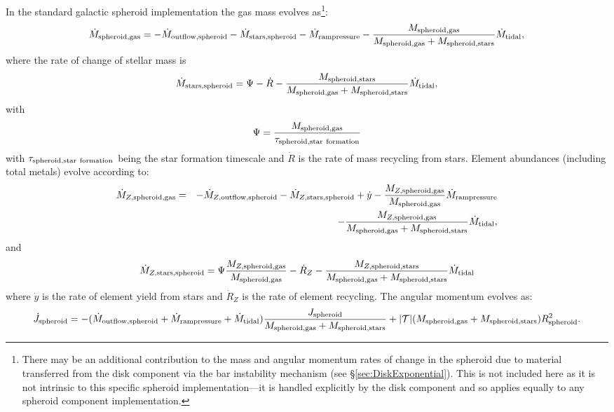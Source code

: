 In the standard galactic spheroid implementation the gas mass evolves as\footnote{There may be an additional contribution to the mass and angular momentum rates of change in the spheroid due to material transferred from the disk \gls{component} via the bar instability mechanism (see \S\protect\ref{sec:DiskExponential}). This is not included here as it is not intrinsic to this specific spheroid implementation---it is handled explicitly by the disk \gls{component} and so applies equally to any spheroid \gls{component} implementation.}:
\begin{equation}
 \dot{M}_{\rm spheroid, gas} = - \dot{M}_{\rm outflow, spheroid} - \dot{M}_{\rm stars, spheroid} - \dot{M}_{\rm ram pressure} - {M_{\rm spheroid, gas} \over M_{\rm spheroid, gas} + M_{\rm spheroid, stars}} \dot{M}_{\rm tidal},
\end{equation}
where the rate of change of stellar mass is
\begin{equation}
 \dot{M}_{\rm stars, spheroid} = \Psi - \dot{R} - {M_{\rm spheroid, stars} \over M_{\rm spheroid, gas} + M_{\rm spheroid, stars}} \dot{M}_{\rm tidal},
\end{equation}
with
\begin{equation}
 \Psi = {M_{\rm spheroid, gas} \over \tau_{\rm spheroid, star~formation}}
\end{equation}
with $\tau_{\rm spheroid, star~formation}$ being the star formation timescale and $\dot{R}$ is the rate of mass recycling from stars.
Element abundances (including total metals) evolve according to:
\begin{eqnarray}
  \dot{M}_{Z, {\rm spheroid, gas}} &=& - \dot{M}_{Z, {\rm outflow, spheroid}} - \dot{M}_{Z, {\rm stars, spheroid}} + \dot{y} - {M_{Z, {\rm spheroid, gas}} \over M_{\rm spheroid, gas}} \dot{M}_{\rm ram pressure} \nonumber \\ 
 & & - {M_{Z, {\rm spheroid, gas}} \over M_{\rm spheroid, gas} + M_{\rm spheroid, stars}} \dot{M}_{\rm tidal},
\end{eqnarray}
and
\begin{equation}
 \dot{M}_{Z, {\rm stars, spheroid}} = \Psi {M_{Z, {\rm spheroid, gas}} \over M_{\rm spheroid, gas}} - \dot{R}_Z - {M_{Z, {\rm spheroid, stars}} \over M_{\rm spheroid, gas} + M_{\rm spheroid, stars}} \dot{M}_{\rm tidal}
\end{equation}
where $\dot{y}$ is the rate of element yield from stars and $\dot{R}_Z$ is the rate of element recycling. The angular momentum evolves as:
\begin{equation}
 \dot{J}_{\rm spheroid} = - (\dot{M}_{\rm outflow, spheroid} + \dot{M}_{\rm ram pressure}+\dot{M}_{\rm tidal}) {J_{\rm spheroid} \over M_{\rm spheroid, gas} + M_{\rm spheroid, stars}} + |\mathcal{T}| ( M_{\rm spheroid, gas} + M_{\rm spheroid, stars} ) R_{\rm spheroid}^2.
 \label{eq:SpheroidStandardAngularMomentumEvolution}
\end{equation}
